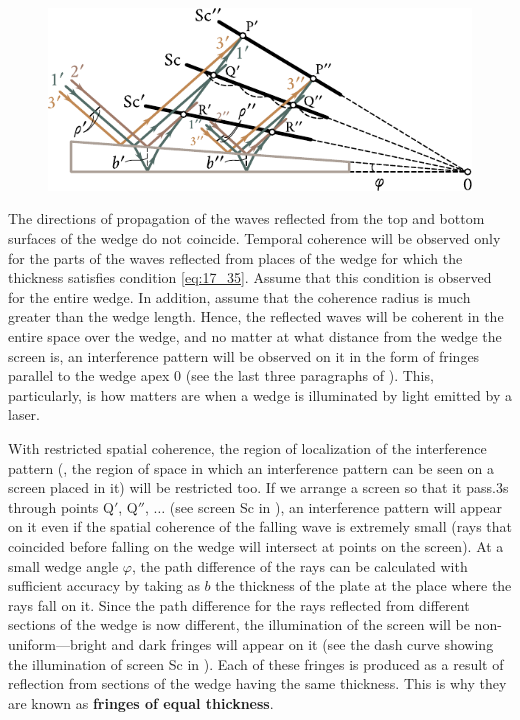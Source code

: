 \begin{figure}[t]
	\begin{center}
		\includegraphics[scale=1]{figures/ch_17/fig_17_13.pdf}
		\caption[]{}
		\label{fig:17_13}
	\end{center}
	\vspace{-0.8cm}
\end{figure}

The directions of propagation of the waves reflected from the top and bottom surfaces of the wedge do not coincide.
Temporal coherence will be observed only for the parts of the waves reflected from places of the wedge for which the thickness satisfies condition \eqref{eq:17_35}.
Assume that this condition is observed for the entire wedge.
In addition, assume that the coherence radius is much greater than the wedge length.
Hence, the reflected waves will be coherent in the entire space over the wedge, and no matter at what distance from the wedge the screen is, an interference pattern will be observed on it in the form of fringes parallel to the wedge apex $0$ (see the last three paragraphs of ).
This, particularly, is how matters are when a wedge is illuminated by light emitted by a laser.

With restricted spatial coherence, the region of localization of the interference pattern (\ie, the region of space in which an interference pattern can be seen on a screen placed in it) will be restricted too.
If we arrange a screen so that it pass.3s through points Q$'$, Q$''$, $\ldots$ (see screen Sc in ), an interference pattern will appear on it even if the spatial coherence of the falling wave is extremely small (rays that coincided before falling on the wedge will intersect at points on the screen).
At a small wedge angle $\varphi$, the path difference of the rays can be calculated with sufficient accuracy by  taking as $b$ the thickness of the plate at the place where the rays fall on it.
Since the path difference for the rays reflected from different sections of the wedge is now different, the illumination of the screen will be non-uniform---bright and dark fringes will appear on it (see the dash curve showing the illumination of screen Sc in ).
Each of these fringes is produced as a result of reflection from sections of the wedge having the same thickness.
This is why they are known as \textbf{fringes of equal thickness}.

